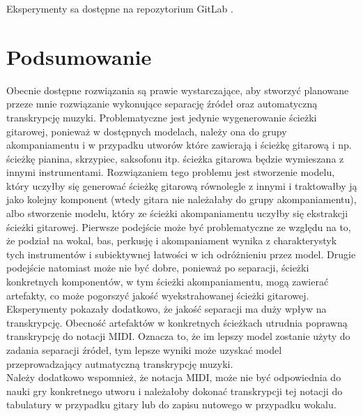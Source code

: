 \documentclass{article}
\begin{document}
Eksperymenty sa dostępne na repozytorium GitLab \cite{repo}.


\section{Podsumowanie}
Obecnie dostępne rozwiązania są prawie wystarczające, aby stworzyć planowane przeze mnie rozwiązanie wykonujące separację źródeł oraz automatyczną transkrypcję muzyki. Problematyczne jest jedynie wygenerowanie ścieżki gitarowej, ponieważ w dostępnych modelach, należy ona do grupy akompaniamentu i w przypadku utworów które zawierają i ścieżkę gitarową i np. ścieżkę pianina, skrzypiec, saksofonu itp. ścieżka gitarowa będzie wymieszana z innymi instrumentami. Rozwiązaniem tego problemu jest stworzenie modelu, który uczyłby się generować ścieżkę gitarową równolegle z innymi i traktowałby ją jako kolejny komponent (wtedy gitara nie należałaby do grupy akompaniamentu), albo stworzenie modelu, który ze ścieżki akompaniamentu uczyłby się ekstrakcji ścieżki gitarowej. Pierwsze podejście może być problematyczne ze względu na to, że podział na wokal, bas, perkusję i akompaniament wynika z charakterystyk tych instrumentów i subiektywnej łatwości w ich odróżnieniu przez model. Drugie podejście natomiast może nie być dobre, ponieważ po separacji, ścieżki konkretnych komponentów, w tym ścieżki akompaniamentu, mogą zawierać artefakty, co może pogorszyć jakość wyekstrahowanej ścieżki gitarowej.\\

Eksperymenty pokazały dodatkowo, że jakość separacji ma duży wpływ na transkrypcję. Obecność artefaktów w konkretnych ścieżkach utrudnia poprawną transkrypcję do notacji MIDI. Oznacza to, że im lepszy model zostanie użyty do zadania separacji źródeł, tym lepsze wyniki może uzyskać model przeprowadzający autmatyczną transkrypcję muzyki.\\

Należy dodatkowo wspomnież, że notacja MIDI, może nie być odpowiednia do nauki gry konkretnego utworu i należałoby dokonać transkrypcji tej notacji do tabulatury w przypadku gitary lub do zapisu nutowego w przypadku wokalu.





\end{document}
